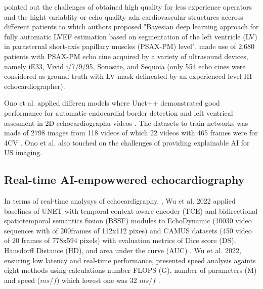 \cite{jafari2021} pointed out the challenges of obtained high quality for less experience operators and the hight variablity or echo quality adn cardiovascular structures accross different patients to which authors proposed "Bayesian deep learning approach for fully automatic LVEF estimation based on segmentation of the left ventricle (LV) in parasternal short-axis papillary muscles (PSAX-PM) level". 
\cite{jafari2021} made use of 2,680 patients with PSAX-PM echo cine acquired by a variety of ultrasound devices, namely iE33, Vivid i/7/9/95, Sonosite, and Sequoia (only 554 echo cines were considered as ground truth with LV mask delineated by an experienced level III
echocardiographer).

Ono et al. applied differen models where Unet++ demonstrated good performance for automatic endocardial border detection and left ventrical assesment in 2D echocardiographu videos \cite{ono2022}.
The datasets to train networks was made of 2798 images from 118 videos of which 22 videos with 465 frames were for 4CV \cite{ono2022}.
Ono et al. also touched on the challenges of providing explainable AI for US imaging.

\subsection{Real-time AI-empowwered echocardiography}
In terms of real-time analysys of echocardigraphy, , Wu et al. 2022 applied baselines of UNET with temporal context-aware encoder (TCE) and bidirectional spatiotemporal semantics fusion (BSSF) modules to EchoDynamic (10030 video sequences with of 200frames of 112x112 pixes) and CAMUS datasets  (450 video of 20 frames of 778x594 pixels) with evaluation metrics of Dice score (DS), Hausdorff Distance (HD), and area under the curve (AUC) \cite{wu20222}.
Wu et al. 2022, ensuring low latency and real-time performance, presented speed analysis againts eight methods using calculations number FLOPS (G), number of parameters (M) and speed ($ms/f$) which lowest one was 32 $ms/f$  \cite{wu20222}.

